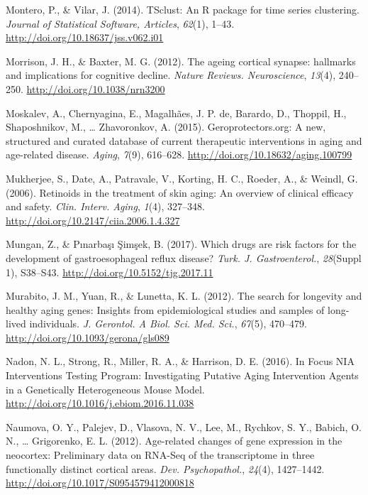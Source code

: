 \documentclass[12pt,twoside]{unicam}
\begin{document}
\begin{cslreferences}
\leavevmode\hypertarget{ref-Montero2014}{}%
Montero, P., \& Vilar, J. (2014). TSclust: An R package for time series clustering. \emph{Journal of Statistical Software, Articles}, \emph{62}(1), 1--43. \url{http://doi.org/10.18637/jss.v062.i01}

\leavevmode\hypertarget{ref-Morrison2012}{}%
Morrison, J. H., \& Baxter, M. G. (2012). The ageing cortical synapse: hallmarks and implications for cognitive decline. \emph{Nature Reviews. Neuroscience}, \emph{13}(4), 240--250. \url{http://doi.org/10.1038/nrn3200}

\leavevmode\hypertarget{ref-Moskalev2015}{}%
Moskalev, A., Chernyagina, E., Magalhães, J. P. de, Barardo, D., Thoppil, H., Shaposhnikov, M., \ldots{} Zhavoronkov, A. (2015). Geroprotectors.org: A new, structured and curated database of current therapeutic interventions in aging and age-related disease. \emph{Aging}, \emph{7}(9), 616--628. \url{http://doi.org/10.18632/aging.100799}

\leavevmode\hypertarget{ref-Mukherjee2006}{}%
Mukherjee, S., Date, A., Patravale, V., Korting, H. C., Roeder, A., \& Weindl, G. (2006). Retinoids in the treatment of skin aging: An overview of clinical efficacy and safety. \emph{Clin. Interv. Aging}, \emph{1}(4), 327--348. \url{http://doi.org/10.2147/ciia.2006.1.4.327}

\leavevmode\hypertarget{ref-Mungan2017}{}%
Mungan, Z., \& Pınarbaşı Şimşek, B. (2017). Which drugs are risk factors for the development of gastroesophageal reflux disease? \emph{Turk. J. Gastroenterol.}, \emph{28}(Suppl 1), S38--S43. \url{http://doi.org/10.5152/tjg.2017.11}

\leavevmode\hypertarget{ref-Murabito2012}{}%
Murabito, J. M., Yuan, R., \& Lunetta, K. L. (2012). The search for longevity and healthy aging genes: Insights from epidemiological studies and samples of long-lived individuals. \emph{J. Gerontol. A Biol. Sci. Med. Sci.}, \emph{67}(5), 470--479. \url{http://doi.org/10.1093/gerona/gls089}

\leavevmode\hypertarget{ref-Nadon2016}{}%
Nadon, N. L., Strong, R., Miller, R. A., \& Harrison, D. E. (2016). In Focus NIA Interventions Testing Program: Investigating Putative Aging Intervention Agents in a Genetically Heterogeneous Mouse Model. \url{http://doi.org/10.1016/j.ebiom.2016.11.038}

\leavevmode\hypertarget{ref-Naumova2012}{}%
Naumova, O. Y., Palejev, D., Vlasova, N. V., Lee, M., Rychkov, S. Y., Babich, O. N., \ldots{} Grigorenko, E. L. (2012). Age-related changes of gene expression in the neocortex: Preliminary data on RNA-Seq of the transcriptome in three functionally distinct cortical areas. \emph{Dev. Psychopathol.}, \emph{24}(4), 1427--1442. \url{http://doi.org/10.1017/S0954579412000818}


\end{cslreferences}
\end{document}
